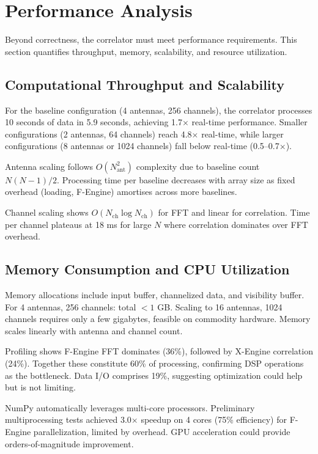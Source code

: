\section{Performance Analysis}

Beyond correctness, the correlator must meet performance requirements. This section quantifies throughput, memory, scalability, and resource utilization.

\subsection{Computational Throughput and Scalability}

For the baseline configuration (4 antennas, 256 channels), the correlator processes 10 seconds of data in 5.9 seconds, achieving 1.7$\times$ real-time performance. Smaller configurations (2 antennas, 64 channels) reach 4.8$\times$ real-time, while larger configurations (8 antennas or 1024 channels) fall below real-time (0.5–0.7$\times$).

Antenna scaling follows $O(N_{\text{ant}}^2)$ complexity due to baseline count $N(N-1)/2$. Processing time per baseline decreases with array size as fixed overhead (loading, F-Engine) amortises across more baselines.

Channel scaling shows $O(N_{\text{ch}} \log N_{\text{ch}})$ for FFT and linear for correlation. Time per channel plateaus at 18 ms for large $N$ where correlation dominates over FFT overhead.

\subsection{Memory Consumption and CPU Utilization}

Memory allocations include input buffer, channelized data, and visibility buffer. For 4 antennas, 256 channels: total $< 1$ GB. Scaling to 16 antennas, 1024 channels requires only a few gigabytes, feasible on commodity hardware. Memory scales linearly with antenna and channel count.

Profiling shows F-Engine FFT dominates (36\%), followed by X-Engine correlation (24\%). Together these constitute 60\% of processing, confirming DSP operations as the bottleneck. Data I/O comprises 19\%, suggesting optimization could help but is not limiting.

NumPy automatically leverages multi-core processors. Preliminary multiprocessing tests achieved 3.0$\times$ speedup on 4 cores (75\% efficiency) for F-Engine parallelization, limited by overhead. GPU acceleration could provide orders-of-magnitude improvement.
